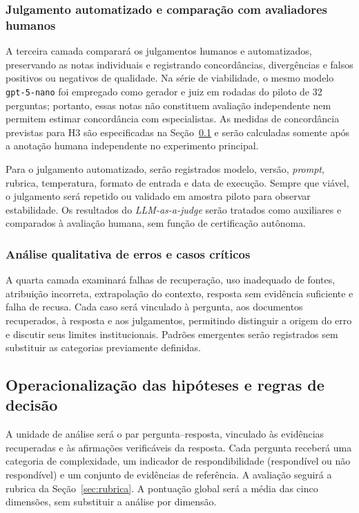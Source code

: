 \subsubsection{Julgamento automatizado e comparação com avaliadores humanos}

A terceira camada comparará os julgamentos humanos e automatizados, preservando as notas individuais e registrando concordâncias, divergências e falsos positivos ou negativos de qualidade. Na série de viabilidade, o mesmo modelo \texttt{gpt-5-nano} foi empregado como gerador e juiz em rodadas do piloto de 32 perguntas; portanto, essas notas não constituem avaliação independente nem permitem estimar concordância com especialistas. As medidas de concordância previstas para H3 são especificadas na Seção~\ref{sec:hipoteses-operacionais} e serão calculadas somente após a anotação humana independente no experimento principal.

Para o julgamento automatizado, serão registrados modelo, versão, \textit{prompt}, rubrica, temperatura, formato de entrada e data de execução. Sempre que viável, o julgamento será repetido ou validado em amostra piloto para observar estabilidade. Os resultados do \textit{LLM-as-a-judge} serão tratados como auxiliares e comparados à avaliação humana, sem função de certificação autônoma.

\subsubsection{Análise qualitativa de erros e casos críticos}

A quarta camada examinará falhas de recuperação, uso inadequado de fontes, atribuição incorreta, extrapolação do contexto, resposta sem evidência suficiente e falha de recusa. Cada caso será vinculado à pergunta, aos documentos recuperados, à resposta e aos julgamentos, permitindo distinguir a origem do erro e discutir seus limites institucionais. Padrões emergentes serão registrados sem substituir as categorias previamente definidas.

\subsection{Operacionalização das hipóteses e regras de decisão}
\label{sec:hipoteses-operacionais}

A unidade de análise será o par pergunta--resposta, vinculado às evidências recuperadas e às afirmações verificáveis da resposta. Cada pergunta receberá uma categoria de complexidade, um indicador de respondibilidade (respondível ou não respondível) e um conjunto de evidências de referência. A avaliação seguirá a rubrica da Seção~\ref{sec:rubrica}. A pontuação global será a média das cinco dimensões, sem substituir a análise por dimensão.

